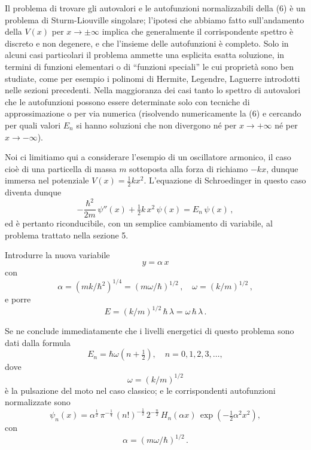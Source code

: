 \documentclass[11pt, a4paper]{book}
\numberwithin{equation}{section}
\begin{document}
Il problema di trovare gli autovalori e le autofunzioni normalizzabili
della (6) è un problema di Sturm-Liouville singolare; l'ipotesi che abbiamo
fatto sull'andamento della $V(x)$ per $x \to \pm\infty$ implica che generalmente il
corrispondente spettro è discreto e non degenere, e che l'insieme delle
autofunzioni è completo. Solo in alcuni casi particolari il problema ammette
una esplicita esatta soluzione, in termini di funzioni elementari o di ``funzioni speciali'' le cui proprietà sono ben studiate, come per esempio i polinomi di Hermite, Legendre, Laguerre introdotti nelle sezioni precedenti.
Nella maggioranza dei casi tanto lo spettro di autovalori che le autofunzioni
possono essere determinate solo con tecniche di approssimazione o per via
numerica (risolvendo numericamente la (6) e cercando per quali valori $E_n$
si hanno soluzioni che non divergono né per $x \to +\infty$ né per $x \to -\infty$).

Noi ci limitiamo qui a considerare l'esempio di un oscillatore armonico, il caso cioè di una particella di massa $m$ sottoposta alla forza di richiamo $-kx$, dunque immersa nel potenziale $V(x) = \frac{1}{2}kx^2$. L'equazione
di Schroedinger in questo caso diventa dunque
\begin{equation}
-\frac{\hbar^2}{2m}\, \psi''(x) + \tfrac{1}{2}k\, x^2\, \psi(x) = E_n\, \psi(x) \,, \tag{7}
\end{equation}
ed è pertanto riconducibile, con un semplice cambiamento di variabile, al
problema trattato nella sezione 5.


Introdurre la nuova variabile
\[
y = \alpha\, x
\]
con
\[
\alpha = (mk/\hbar^2)^{1/4} = (m\omega/\hbar)^{1/2} \,, \quad \omega = (k/m)^{1/2} \,,
\]
e porre
\[
E = (k/m)^{1/2}\, \hbar\, \lambda = \omega\, \hbar\, \lambda \,.
\]

Se ne conclude immediatamente che i livelli energetici di questo
problema sono dati dalla formula
\begin{equation}
E_n = \hbar\omega\left(n + \tfrac{1}{2}\right), \quad n = 0, 1, 2, 3, \ldots, \tag{8}
\end{equation}
dove
\begin{equation}
\omega = (k/m)^{1/2} \tag{9}
\end{equation}
è la pulsazione del moto nel caso classico; e le corrispondenti autofunzioni
normalizzate sono
\begin{equation}
\psi_n(x) = \alpha^{\frac{1}{2}}\, \pi^{-\frac{1}{4}}\, (n!)^{-\frac{1}{2}}\, 2^{-\frac{n}{2}}\, H_n(\alpha x)\, \exp\!\left(-\tfrac{1}{2}\alpha^2 x^2\right), \tag{10}
\end{equation}
con
\begin{equation}
\alpha = (m\omega/\hbar)^{1/2} \,. \tag{11}
\end{equation}
\end{document}
